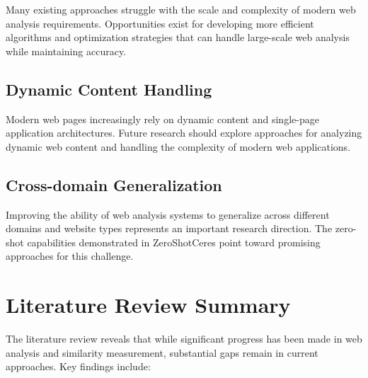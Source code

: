 Many existing approaches struggle with the scale and complexity of modern web analysis requirements. Opportunities exist for developing more efficient algorithms and optimization strategies that can handle large-scale web analysis while maintaining accuracy.

\subsection{Dynamic Content Handling}

Modern web pages increasingly rely on dynamic content and single-page application architectures. Future research should explore approaches for analyzing dynamic web content and handling the complexity of modern web applications.

\subsection{Cross-domain Generalization}

Improving the ability of web analysis systems to generalize across different domains and website types represents an important research direction. The zero-shot capabilities demonstrated in ZeroShotCeres \cite{lockard2020zeroshotceres} point toward promising approaches for this challenge.

\section{Literature Review Summary}
\label{sec:literature-summary}

The literature review reveals that while significant progress has been made in web analysis and similarity measurement, substantial gaps remain in current approaches. Key findings include:

